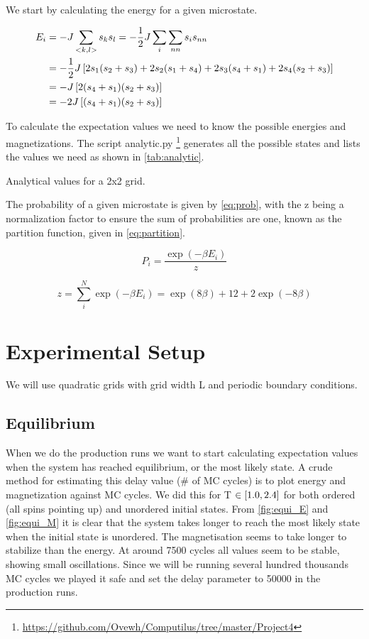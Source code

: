 We start by calculating the energy for a given microstate.

\begin{align*}
  E_i &= -J \sum_{<k,l>} s_k s_l = -\frac{1}{2}J \sum_{i} \sum_{nn} s_i s_{nn} \\
      &= -\frac{1}{2} J \left[2 s_1 (s_2 + s_3) + 2s_2(s_1 + s_4) + 2s_3(s_4 + s_1) + 2s_4 (s_2 + s_3)\right]\\
      &= -J\left[ 2(s_4 + s_1)(s_2 + s_3)\right] \\
      &= -2J\left[(s_4 + s_1)(s_2+s_3)\right]
\end{align*}

To calculate the expectation values we need to know the possible energies and
magnetizations. The script analytic.py
\footnote{\url{https://github.com/Ovewh/Computilus/tree/master/Project4}}
generates all the possible states and lists the values we need as shown in
\cref{tab:analytic}.

\begin{table}[htp]
  \centering
  \caption{Analytical values for a 2x2 grid.}
  \label{tab:analytic}
\end{table}

The probability of a given microstate is given by \cref{eq:prob}, with
the z being a normalization factor to ensure the sum of probabilities are one,
known as the partition function, given in \cref{eq:partition}.


\begin{equation}
  \label{eq:prob}
  P_i = \frac{\exp(-\beta E_i)}{z}
\end{equation}

\begin{equation}
  \label{eq:partition}
  z = \sum_{i}^{N} \exp(-\beta E_i) = \exp(8\beta) + 12 + 2\exp(-8\beta)
\end{equation}


\section{Experimental Setup}
We will
use quadratic grids with grid width L and periodic
boundary conditions.


\subsection{Equilibrium}

When we do the production runs we want to start calculating expectation values
when the system has reached equilibrium, or the most likely state. A crude
method for estimating this delay value (\# of MC cycles) is to plot energy and
magnetization against MC cycles. We did this for T $\in \left[1.0,2.4\right]$ for both
ordered (all spins pointing up) and unordered initial states. From
\cref{fig:equi_E} and \cref{fig:equi_M} it is clear that the system takes longer
to reach the most likely state when the initial state is unordered. The
magnetisation seems to take longer to stabilize than the energy. At around 7500
cycles all values seem to be stable, showing small oscillations. Since we will
be running several hundred thousands MC cycles we played it safe and set the
delay parameter to 50000 in the production runs.

